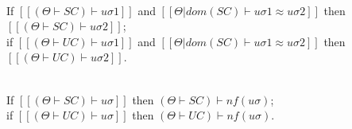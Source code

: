 \begin{corollary}
    \label{corollary:sat-equiv}
    \hfill\\
    If $[[(Θ  ⊢  SC) ⊢ uσ1]]$ and $[[Θ|dom(SC) ⊢ uσ1 ≈ uσ2]]$ then $[[(Θ  ⊢  SC) ⊢ uσ2]]$;\\
    if $[[(Θ  ⊢  UC) ⊢ uσ1]]$ and $[[Θ|dom(SC) ⊢ uσ1 ≈ uσ2]]$ then $[[(Θ  ⊢  UC) ⊢ uσ2]]$.
\end{corollary}

\begin{corollary}
    \label{corollary:nf-sat}
    \hfill\\
    If $[[(Θ  ⊢  SC) ⊢ uσ]]$ then $(Θ  ⊢ SC) ⊢ nf(uσ)$;\\
    if $[[(Θ  ⊢  UC) ⊢ uσ]]$ then $(Θ  ⊢ UC) ⊢ nf(uσ)$.
\end{corollary}



